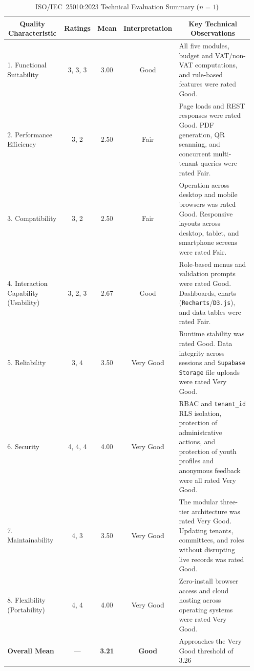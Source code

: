 \begin{table}[H]
\centering
\footnotesize
\setlength{\tabcolsep}{4pt}
\caption{ISO/IEC~25010:2023 Technical Evaluation Summary ($n = 1$)}
\label{tab:iso_25010_technical_evaluation}
\begin{tabular}{|p{2.8cm}|c|c|c|p{4.2cm}|}
\hline
\multicolumn{1}{|c|}{\textbf{Quality Characteristic}} & \textbf{Ratings} & \textbf{Mean} & \textbf{Interpretation} & \multicolumn{1}{c|}{\textbf{Key Technical Observations}} \\ \hline
1. Functional Suitability & 3, 3, 3 & 3.00 & Good & All five modules, budget and VAT/non-VAT computations, and rule-based features were rated Good. \\ \hline
2. Performance Efficiency & 3, 2 & 2.50 & Fair & Page loads and REST responses were rated Good. PDF generation, QR scanning, and concurrent multi-tenant queries were rated Fair. \\ \hline
3. Compatibility & 3, 2 & 2.50 & Fair & Operation across desktop and mobile browsers was rated Good. Responsive layouts across desktop, tablet, and smartphone screens were rated Fair. \\ \hline
4. Interaction Capability (Usability) & 3, 2, 3 & 2.67 & Good & Role-based menus and validation prompts were rated Good. Dashboards, charts (\texttt{Recharts}/\texttt{D3.js}), and data tables were rated Fair. \\ \hline
5. Reliability & 3, 4 & 3.50 & Very Good & Runtime stability was rated Good. Data integrity across sessions and \texttt{Supabase Storage} file uploads were rated Very Good. \\ \hline
6. Security & 4, 4, 4 & 4.00 & Very Good & RBAC and \texttt{tenant\_id} RLS isolation, protection of administrative actions, and protection of youth profiles and anonymous feedback were all rated Very Good. \\ \hline
7. Maintainability & 4, 3 & 3.50 & Very Good & The modular three-tier architecture was rated Very Good. Updating tenants, committees, and roles without disrupting live records was rated Good. \\ \hline
8. Flexibility (Portability) & 4, 4 & 4.00 & Very Good & Zero-install browser access and cloud hosting across operating systems were rated Very Good. \\ \hline
\textbf{Overall Mean} & --- & \textbf{3.21} & \textbf{Good} & Approaches the Very Good threshold of 3.26 \\ \hline
\end{tabular}
\end{table}
\vspace{3mm}

